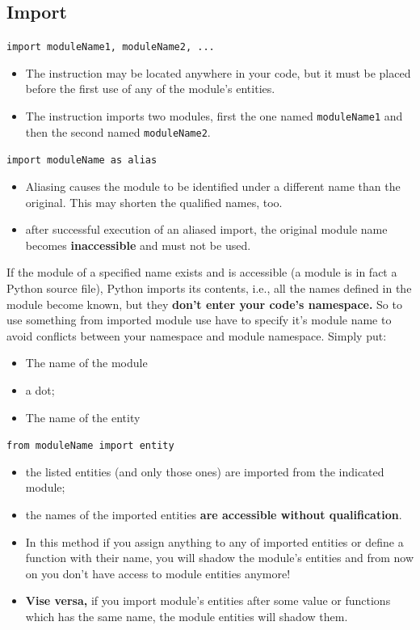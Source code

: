 \documentclass[11pt]{article}
\begin{document}
\subsection{Import}
\label{sec:orga5a2471}
\begin{description}
\item[{syntax}] \texttt{import moduleName1, moduleName2, ...}
\begin{itemize}
\item The instruction may be located anywhere in your code, but it must be
placed before the first use of any of the module’s entities.
\item The instruction imports two modules, first the one named \texttt{moduleName1} and
then the second named \texttt{moduleName2}.
\end{itemize}

\item[{syntax}] \texttt{import moduleName as alias}
\begin{itemize}
\item Aliasing causes the module to be identified under a different
name than the original. This may shorten the qualified names,
too.
\item after successful execution of an aliased import, the original
module name becomes \textbf{inaccessible} and must not be used.
\end{itemize}

\item If the module of a specified name exists and is accessible (a module
is in fact a Python source file), Python imports its contents, i.e.,
all the names defined in the module become known, but they \textbf{don’t
enter your code’s namespace.} So to use something from imported
module use have to specify it's module name to avoid conflicts
between your namespace and module namespace. Simply put:
\begin{itemize}
\item The name of the module
\item a dot;
\item The name of the entity
\end{itemize}

\item[{syntax}] \texttt{from moduleName import entity}
\begin{itemize}
\item the listed entities (and only those ones) are imported from the
indicated module;
\item the names of the imported entities \textbf{are accessible without
qualification}.
\item In this method if you assign anything to any of imported entities
or define a function with their name, you will shadow the module's
entities and from now on you don't have access to module entities
anymore!
\item \textbf{Vise versa,} if you import module's entities after some value or
functions which has the same name, the module entities will shadow
them.
\end{itemize}


\end{description}
\end{document}
